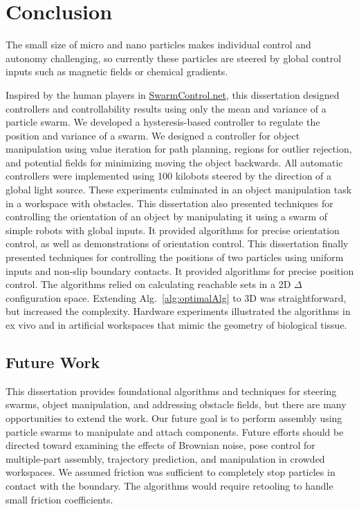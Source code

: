 
\chapter[Conclusion]{Conclusion}
\label{chap-conc}


  The small size of micro and nano particles makes individual control and autonomy challenging, so currently these particles are steered by global control inputs such as magnetic fields or chemical gradients.

Inspired by the human players in \href{www.swarmcontrol.net}{SwarmControl.net}, this dissertation designed controllers and controllability results using only the mean and variance of a particle swarm. 
We developed a hysteresis-based controller to regulate the position and variance of a swarm. We designed a controller for object manipulation using value iteration for path planning, regions for outlier rejection, and potential fields for minimizing moving the object backwards. 
All automatic controllers were implemented using 100 kilobots steered by the direction of a global light source.
These experiments culminated in an object manipulation task in a workspace with obstacles.
This dissertation also presented techniques for controlling the orientation of an object by manipulating it using a swarm of simple robots with global inputs.
It provided algorithms for precise orientation control, as well as demonstrations of orientation control. 
 This dissertation finally presented techniques for controlling the positions of two particles using uniform inputs and non-slip boundary contacts.  
 It provided algorithms for precise position control. The algorithms relied on calculating reachable sets in a 2D $\Delta$ configuration space.
 Extending Alg.~\ref{alg:optimalAlg}  to 3D was straightforward, but increased the complexity.
 Hardware experiments illustrated the algorithms in ex vivo and in artificial workspaces that mimic the geometry of biological tissue.
 
 \section{Future Work}
 This dissertation provides foundational algorithms and techniques for steering swarms, object manipulation, and addressing obstacle fields, but there are many opportunities to extend the work.
 Our future goal is to perform assembly using particle swarms to manipulate and attach components. Future efforts should be directed toward examining the effects of Brownian noise, pose control for multiple-part assembly, trajectory prediction, and manipulation in crowded workspaces.
 We assumed friction was sufficient to completely stop particles in contact with the boundary. 
  The algorithms would require retooling to handle small friction coefficients.
 
